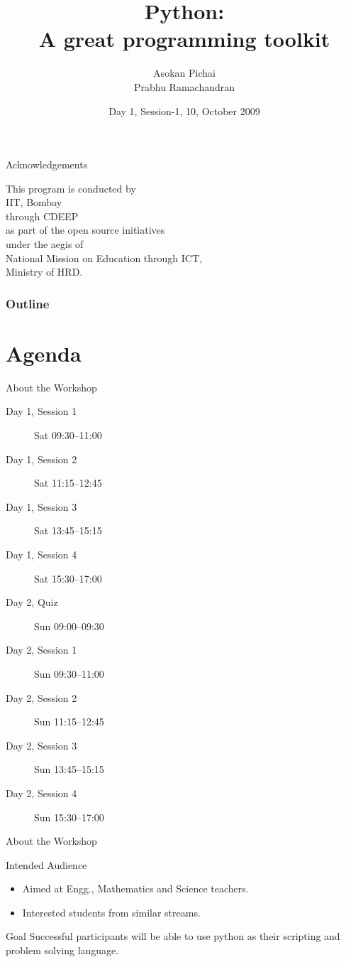 \documentclass[14pt,compress]{beamer}
\title[Basic Python]{Python:\\A great programming toolkit}
\author[FOSSEE Team] {Asokan Pichai\\Prabhu Ramachandran}
\institute[IIT Bombay] {Department of Aerospace Engineering\\IIT Bombay}
\date[] {Day 1, Session-1, 10, October 2009}
\begin{document}
\begin{frame}
  \titlepage
\end{frame}
\begin{frame}
  {Acknowledgements}
  \begin{center}
  This program is conducted by\\
  IIT, Bombay\\
  through CDEEP\\as part of  the open source initiatives\\
  under the aegis of\\
  \alert{National Mission on Education through ICT,} \\
  Ministry of HRD.
  \end{center}
\end{frame}

\begin{frame}
  \frametitle{Outline}
  \tableofcontents
\end{frame}

%

\section{Agenda}
\begin{frame}{About the Workshop}
  \begin{description}
	\item[Day 1, Session 1] Sat 09:30--11:00
	\item[Day 1, Session 2] Sat 11:15--12:45
	\item[Day 1, Session 3] Sat 13:45--15:15
	\item[Day 1, Session 4] Sat 15:30--17:00
        \item[Day 2, Quiz] Sun 09:00--09:30
        \item[Day 2, Session 1] Sun 09:30--11:00
	\item[Day 2, Session 2] Sun 11:15--12:45
	\item[Day 2, Session 3] Sun 13:45--15:15
	\item[Day 2, Session 4] Sun 15:30--17:00
  \end{description}
\end{frame}

\begin{frame}{About the Workshop}
  \begin{block}{Intended Audience}
  \begin{itemize}
       \item Aimed at Engg., Mathematics and Science teachers.
       \item Interested students from similar streams.
  \end{itemize}
  \end{block}  

  \begin{block}{Goal}
	Successful participants will be able to use python as their scripting and problem solving language. 
  \end{block}
\end{frame}
\end{document}

